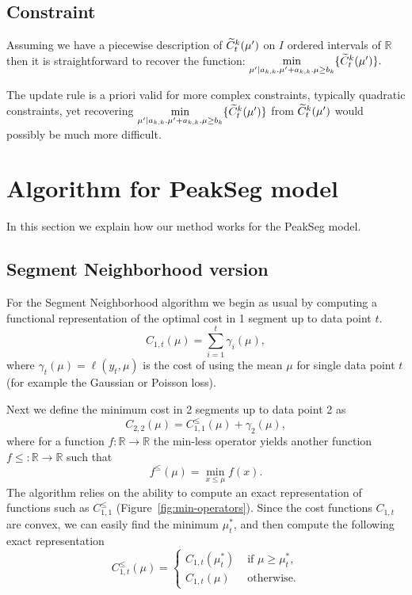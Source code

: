 \documentclass{article}
\newcommand{\RR}{\mathbb R}
\begin{document}
\subsection{Constraint}
Assuming we have a piecewise description of $\widetilde{C}^{k}_{t}(\mu')$ on $I$ ordered intervals of $\mathbb{R}$
then it is straightforward to recover the function:
$\underset{\mu' | a_{k,k}. \mu' + a_{k,k}. \mu  \geq  b_{k}}{\min} \{ \widetilde{C}^{k}_{t}(\mu') \}.$

The update rule is a priori valid for more complex constraints, typically quadratic constraints, yet recovering
$\underset{\mu' | a_{k,k}. \mu' + a_{k,k}. \mu  \geq  b_{k}}{\min} \{ \widetilde{C}^{k}_{t}(\mu') \}$ from $\widetilde{C}^{k}_{t}(\mu')$ would possibly be much more difficult.


\section{Algorithm for PeakSeg model}

In this section we explain how our method works for the PeakSeg model.

\subsection{Segment Neighborhood version}

For the Segment Neighborhood algorithm we begin as usual by computing
a functional representation of the optimal cost in 1 segment up to
data point $t$. 
\begin{equation*}
  \label{eq:C1b}
  C_{1,t}(\mu) = \sum_{i=1}^t \gamma_i(\mu),
\end{equation*}
where $\gamma_t(\mu)=\ell(y_t, \mu)$ is the cost of using the mean
$\mu$ for single data point $t$ (for example the Gaussian or Poisson
loss).

Next we define the minimum cost in 2 segments up to data point 2 as
\begin{equation*}
  \label{eq:C22}
  C_{2,2}(\mu) = C_{1,1}^{\leq}(\mu) + \gamma_2(\mu),
\end{equation*}
where for a function $f:\RR\rightarrow\RR$ the min-less operator
yields another function $f\leq:\RR\rightarrow\RR$ such that
\begin{equation}
  \label{eq:min-less}
  f^{\leq}(\mu) = \min_{x\leq \mu} f(x).
\end{equation}
The algorithm relies on the ability to compute an exact representation
of functions such as $C_{1,1}^{\leq}$
(Figure~\ref{fig:min-operators}). Since the cost functions $C_{1,t}$
are convex, we can easily find the minimum $\mu_t^*$, and then compute
the following exact representation
\begin{equation*}
  C_{1,t}^\leq(\mu)=
  \begin{cases}
    C_{1,t}(\mu_t^*) & \text{ if } \mu \geq \mu_t^*,\\
    C_{1,t}(\mu) & \text{ otherwise.}
  \end{cases}
\end{equation*}
\end{document}
